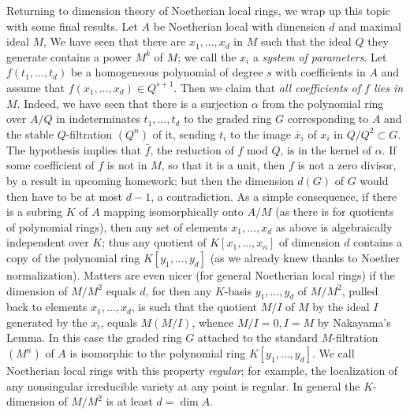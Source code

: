 Returning to dimension theory of Noetherian local rings, we wrap up this topic with some final results.  Let $A$ be Noetherian local with dimension $d$ and maximal ideal $M$,  We have seen that there are $x_1,\ldots,x_d$ in $M$ such that the ideal $Q$ they generate contains a power $M^k$ of $M$; we call the $x_i$ a {\sl system of parameters}.  Let $f(t_1,\ldots,t_d)$ be a homogeneous polynomial of degree $s$ with coefficients in $A$ and assume that $f(x_1,\ldots,x_d)\in Q^{s+1}$.  Then we claim that {\sl all coefficients of $f$ lies in $M$}.  Indeed, we have seen that there is a surjection $\alpha$ from the polynomial ring over $A/Q$ in indeterminates $t_1,\ldots,t_d$ to the graded ring $G$ corresponding to $A$ and the stable $Q$-filtration $(Q^n)$ of it, sending $t_i$ to the image $\bar{x}_i$ of $x_i$ in $Q/Q^2\subset G$.  The hypothesis implies that $\bar{f}$, the reduction of $f$ mod $Q$, is in the kernel of $\alpha$.  If some coefficient of $f$ is not in $M$, so that it is a unit, then $f$ is not a zero divisor, by a result in upcoming homework; but then the dimension $d(G)$ of $G$ would then have to be at most $d-1$, a contradiction.  As a simple consequence, if there is a subring $K$ of $A$ mapping isomorphically onto $A/M$ (as there is for quotients of polynomial rings), then any set of elements $x_1,\ldots,x_d$ as above is algebraically independent over $K$; thus any quotient of
$K[x_1,\ldots,x_n]$ of dimension $d$ contains a copy of the polynomial ring $K[y_1,\ldots,y_d]$ (as we already knew thanks to Noether normalization).  Matters are even nicer (for general Noetherian local rings) if the dimension of $M/M^2$ equals $d$, for then any $K$-basis $y_1,\ldots,y_d$ of
$M/M^2$, pulled back to elements $x_1,\ldots,x_d$, is such that the quotient $M/I$ of $M$ by the ideal $I$ generated by the $x_i$, equals $M(M/I)$, whence $M/I = 0, I = M$ by Nakayama's Lemma.  In this case the graded ring $G$ attached to the standard $M$-filtration $(M^n)$ of $A$ is isomorphic to the polynomial ring $K[y_1,\ldots,y_d]$.  We call Noetherian local rings with this property
{\sl regular}; for example, the localization of any nonsingular irreducible variety at any point is regular.  In general the $K$-dimension of $M/M^2$ is at least $d=\dim A$.
